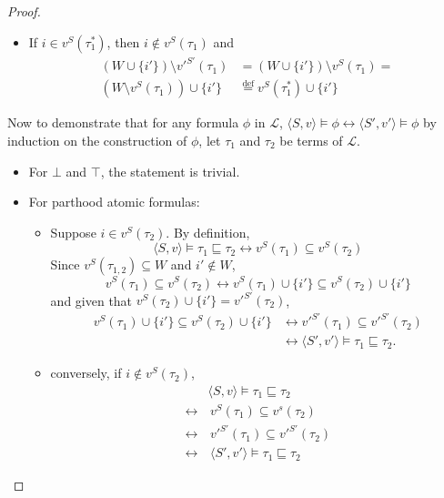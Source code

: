 \documentclass{article}
\newcommand{\lang}{\mathcal{L}}
\newcommand{\lstar}{^*}
\newcommand{\lpart}{\sqsubseteq}
\newcommand{\eqdef}{\stackrel{\text{def}}{=}}
\begin{document}
\begin{proof}
\begin{itemize}
\begin{itemize}
\begin{itemize}
      \item If $i \in v^S(\tau_1\lstar)$, then $i \not \in v^S(\tau_1)$ and
        \begin{align*}
          (W \cup \{i'\}) \setminus v'^{S'}(\tau_1) &= (W \cup \{i'\}) \setminus v^S(\tau_1) = \\
          (W \setminus v^S(\tau_1)) \cup \{i'\} &\eqdef v^S(\tau_1\lstar) \cup \{i'\}
        \end{align*}
      \end{itemize}

    \end{itemize}
\end{itemize}
Now to demonstrate that for any formula $\phi$ in $\lang$, $\langle S, v \rangle \models \phi \leftrightarrow \langle S', v' \rangle \models \phi$ by induction on the construction of $\phi$, let $\tau_1$ and $\tau_2$ be terms of $\lang$.
\begin{itemize}
  \item For $\bot$ and $\top$, the statement is trivial.
  \item For parthood atomic formulas:
    \begin{itemize}
    \item Suppose $i \in v^S(\tau_2)$. By definition,
      \begin{equation*}
        \langle S, v \rangle \models \tau_1 \lpart \tau_2 \leftrightarrow v^S(\tau_1) \subseteq v^S(\tau_2)
      \end{equation*}
      Since $v^S(\tau_{1,2}) \subseteq W$ and $i' \not \in W$,
      \begin{equation*}
         v^S(\tau_1) \subseteq v^S(\tau_2) \leftrightarrow v^S(\tau_1) \cup \{i'\} \subseteq v^S(\tau_2) \cup \{i'\}
      \end{equation*}
      and given that $v^S(\tau_2) \cup \{i'\} = v'^{S'}(\tau_2)$,
      \begin{align*}
        v^S(\tau_1) \cup \{i'\} \subseteq v^S(\tau_2) \cup \{i'\} &\leftrightarrow v'^{S'}(\tau_1) \subseteq v'^{S'}(\tau_2) \\
        &\leftrightarrow \langle S', v' \rangle \models \tau_1 \lpart \tau_2.
      \end{align*}
    \item conversely, if $i \not \in v^S(\tau_2)$,
      \begin{align*}
        &\langle S, v \rangle \models \tau_1 \lpart \tau_2 \\
        \leftrightarrow&\, v^S(\tau_1) \subseteq v^s(\tau_2) \\
        \leftrightarrow&\, v'^{S'}(\tau_1) \subseteq v'^{S'}(\tau_2) \\
        \leftrightarrow&\, \langle S', v' \rangle \models \tau_1 \lpart \tau_2
      \end{align*}


\end{itemize}
\end{itemize}
\end{proof}
\end{document}
